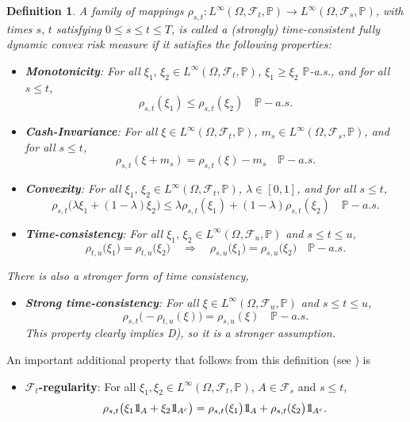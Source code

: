 \documentclass{article}
\newcommand{\lofsp}{L^\infty(\Omega,\mathcal{F}_s,  \mathbb{P})}
\newcommand{\loftp}{L^\infty(\Omega,\mathcal{F}_t,  \mathbb{P})}
\def\ind{{\mathchoice{1\mskip-4mu\mathrm l}{1\mskip-4mu\mathrm l}
		{1\mskip-4.5mu\mathrm l}{1\mskip-5mu\mathrm l}}}
\newtheorem{definition}{Definition}[section]
\begin{document}
\begin{definition}
	A family of mappings $\rho_{s, t}: \loftp \to \lofsp$,  with times $s, \,  t$ satisfying $0 \leq s \leq  t \leq T$,  is called a (strongly) time-consistent fully dynamic convex risk measure if it satisfies the following properties:
	\begin{itemize}
		\item[A)] \textbf{Monotonicity}: For all $\xi_1, \, \xi_2 \in \loftp$, $\xi_1 \geq \xi_2$ $\mathbb{P}$-a.s., and for all $s \leq t$,
		\[
			\rho_{s,t} (\xi_1) \leq \rho_{s,t} (\xi_2) \quad \mathbb{P}-a.s.
		\]
		\item[B)] \textbf{Cash-Invariance}: For all $\xi \in \loftp$, $m_s \in \lofsp$, and for all $s \leq t$,
		\[
			\rho_{s,t} (\xi + m_s) = \rho_{s,t} (\xi) - m_s \quad \mathbb{P}-a.s.
		\]
		\item[C)] \textbf{Convexity}: For all $\xi_1, \, \xi_2 \in \loftp$, $\lambda \in [0,1]$, and for all  $s \leq t$,
		\[
			\rho_{s,t} \bigl(\lambda \xi_1 + (1-\lambda) \xi_2\bigr) \leq \lambda \rho_{s,t} (\xi_1) + (1-\lambda) \rho_{s,t} (\xi_2)  \quad \mathbb{P}-a.s.
		\]
		\item[D)] \textbf{Time-consistency}: For all $\xi_1, \, \xi_2 \in L^\infty(\Omega,\mathcal{F}_u,  \mathbb{P})$ and $s \leq t \leq u$,
		\[
			\rho_{t,u} \bigl(\xi_1\bigr) = \rho_{t,u} \bigl(\xi_2\bigr) \quad \Longrightarrow \quad \rho_{s,u} \bigl(\xi_1\bigr) = \rho_{s,u} \bigl(\xi_2\bigr)  \quad \mathbb{P}-a.s.
		\]
	\end{itemize}
	There is also a stronger form of time consistency,
	\begin{itemize}
		\item[D')] \textbf{Strong time-consistency}: For all $\xi \in L^\infty(\Omega,\mathcal{F}_u,  \mathbb{P})$ and $s \leq t \leq u$,
		\[
			\rho_{s,t} \bigl( -\rho_{t,u} (\xi)\bigr) = \rho_{s,u} (\xi)  \quad \mathbb{P}-a.s.
		\]
		This property clearly implies D), so it is a stronger assumption.
	\end{itemize}
\end{definition}

An important additional property that follows from this definition (see \cite[Section 3]{KS05}) is 
\begin{itemize}
	\item[F)] \textbf{$\mathcal{F}_t$-regularity}: For all $\xi_1, \xi_2 \in \loftp$, $A \in \mathcal{F}_s$ and $s \leq t$,
	\[
		\rho_{s,t} \bigl(\xi_1 \ind_A + \xi_2 \ind_{A^c}\bigr) = \rho_{s,t} (\xi_1\bigr)\ind_A + \rho_{s,t} (\xi_2\bigr)\ind_{A^c}.
	\]
\end{itemize}
\end{document}
